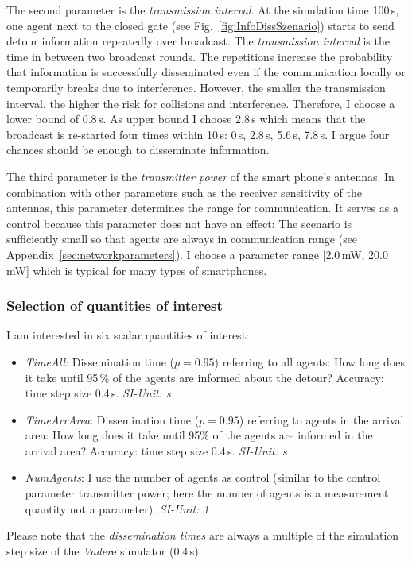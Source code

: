The second parameter is the \textit{transmission interval}. At the simulation time 100\,s, one agent next to the closed gate (see Fig.~\ref{fig:InfoDissSzenario}) starts to send detour information repeatedly over broadcast.   The \textit{transmission interval} is the time in between two broadcast rounds. The repetitions increase the probability that information is successfully disseminated even if the communication locally or temporarily breaks due to interference. However, the smaller the transmission interval, the higher the risk for collisions and interference. Therefore, I choose a lower bound of 0.8\,s. As upper bound I choose 2.8\,s which means that the broadcast is re-started four times within 10\,s: 0\,s, 2.8\,s, 5.6\,s, 7.8\,s. I argue four chances should be enough to disseminate information. 


The third parameter is the \textit{transmitter power} of the smart phone's antennas. In combination with  other parameters such as the receiver sensitivity of the antennas, this parameter determines the range for communication. It serves as a control because this parameter does not have an effect: The scenario is sufficiently small so that agents are always in communication range (see Appendix~\ref{sec:networkparameters}). I choose a parameter range [2.0\,mW, 20.0\,mW] which is typical for many types of smartphones.  %

\subsubsection{Selection of quantities of interest}

I am interested in six scalar quantities of interest:
\begin{itemize}
\item \textit{TimeAll}: Dissemination time ($p=0.95$) referring to all agents: How long does it take until 95\,\% of the agents are informed about the detour? Accuracy: time step size 0.4\,s. \textit{SI-Unit: s}
\item \textit{TimeArrArea}: Dissemination time ($p=0.95$) referring to agents in the arrival area: How long does it take until 95\% of the agents are informed in the arrival area? Accuracy: time step size 0.4\,s. \textit{SI-Unit: s}
\item \textit{NumAgents}: I use the number of agents as control (similar to the control parameter transmitter power; here the number of agents is a measurement quantity not a parameter). \textit{SI-Unit: 1}
\end{itemize}
Please note that the \textit{dissemination times} are always a multiple of the simulation step size of the \textit{Vader}e simulator (0.4\,s). 

